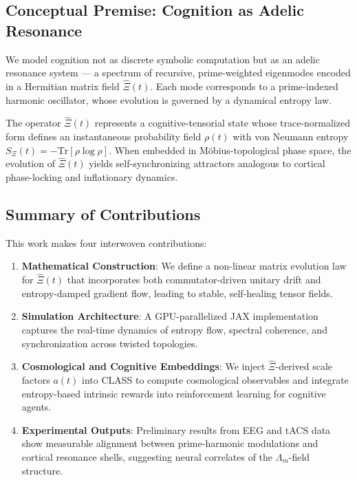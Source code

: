 \documentclass[12pt]{article}
\theoremstyle{plain}
\begin{document}
\subsection{Conceptual Premise: Cognition as Adelic Resonance}

We model cognition not as discrete symbolic computation but as an adelic resonance system — a spectrum of recursive, prime-weighted eigenmodes encoded in a Hermitian matrix field $\hat{\Xi}(t)$. Each mode corresponds to a prime-indexed harmonic oscillator, whose evolution is governed by a dynamical entropy law. 

The operator $\hat{\Xi}(t)$ represents a cognitive-tensorial state whose trace-normalized form defines an instantaneous probability field $\rho(t)$ with von Neumann entropy $S_\Xi(t) = -\text{Tr}[\rho \log \rho]$. When embedded in Möbius-topological phase space, the evolution of $\hat{\Xi}(t)$ yields self-synchronizing attractors analogous to cortical phase-locking and inflationary dynamics.

\subsection{Summary of Contributions}

This work makes four interwoven contributions:

\begin{enumerate}
    \item \textbf{Mathematical Construction}: We define a non-linear matrix evolution law for $\hat{\Xi}(t)$ that incorporates both commutator-driven unitary drift and entropy-damped gradient flow, leading to stable, self-healing tensor fields.
    
    \item \textbf{Simulation Architecture}: A GPU-parallelized JAX implementation captures the real-time dynamics of entropy flow, spectral coherence, and synchronization across twisted topologies.
    
    \item \textbf{Cosmological and Cognitive Embeddings}: We inject $\hat{\Xi}$-derived scale factors $a(t)$ into CLASS to compute cosmological observables and integrate entropy-based intrinsic rewards into reinforcement learning for cognitive agents.
    
    \item \textbf{Experimental Outputs}: Preliminary results from EEG and tACS data show measurable alignment between prime-harmonic modulations and cortical resonance shells, suggesting neural correlates of the $\Lambda_m$-field structure.
\end{enumerate}
\end{document}
